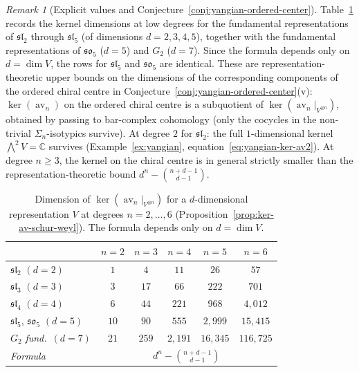 \documentclass[11pt,reqno]{amsart}
\theoremstyle{definition}
\theoremstyle{remark}
\newtheorem{remark}[theorem]{Remark}
\DeclareMathOperator{\av}{av}
\newcommand{\CC}{\mathbb{C}}
\numberwithin{equation}{section}
\begin{document}
\begin{remark}[Explicit values and
Conjecture~\textup{\ref{conj:yangian-ordered-center}}]
\label{rem:ker-av-table}
Table~\ref{tab:ker-av-dims} records the kernel dimensions
at low degrees for the fundamental representations of
$\mathfrak{sl}_2$ through $\mathfrak{sl}_5$ (of dimensions
$d = 2, 3, 4, 5$), together with the fundamental
representations of $\mathfrak{so}_5$ ($d = 5$) and
$G_2$ ($d = 7$). Since the formula depends only on
$d = \dim V$, the rows for $\mathfrak{sl}_5$ and
$\mathfrak{so}_5$ are identical.
These are representation-theoretic upper bounds on the
dimensions of the corresponding components of the ordered
chiral centre in
Conjecture~\ref{conj:yangian-ordered-center}(v):
$\ker(\av_n)$ on the ordered chiral centre is a subquotient
of $\ker(\av_n\big|_{V^{\otimes n}})$, obtained by passing
to bar-complex cohomology
(only the cocycles in the non-trivial $\Sigma_n$-isotypics
survive). At degree $2$ for $\mathfrak{sl}_2$: the full
$1$-dimensional kernel $\bigwedge^2 V = \CC$ survives
(Example~\ref{ex:yangian},
equation~\eqref{eq:yangian-ker-av2}).
At degree $n \geq 3$, the kernel on the chiral centre is
in general strictly smaller than the
representation-theoretic bound $d^n - \binom{n+d-1}{d-1}$.

\begin{table}[h]
\centering
\renewcommand{\arraystretch}{1.3}
\begin{tabular}{@{} l c c c c c @{}}
\toprule
  & $n = 2$ & $n = 3$ & $n = 4$ & $n = 5$ & $n = 6$ \\
\midrule
$\mathfrak{sl}_2$ $(d{=}2)$
  & $1$ & $4$ & $11$ & $26$ & $57$ \\
$\mathfrak{sl}_3$ $(d{=}3)$
  & $3$ & $17$ & $66$ & $222$ & $701$ \\
$\mathfrak{sl}_4$ $(d{=}4)$
  & $6$ & $44$ & $221$ & $968$ & $4{,}012$ \\
$\mathfrak{sl}_5$, $\mathfrak{so}_5$ $(d{=}5)$
  & $10$ & $90$ & $555$ & $2{,}999$ & $15{,}415$ \\
$G_2$ \textit{fund.}\ $(d{=}7)$
  & $21$ & $259$ & $2{,}191$ & $16{,}345$ & $116{,}725$ \\
\midrule
\textit{Formula}
  & \multicolumn{5}{c}{$d^n - \binom{n+d-1}{d-1}$} \\
\bottomrule
\end{tabular}
\caption{Dimension of $\ker(\av_n\big|_{V^{\otimes n}})$
for a $d$-dimensional representation $V$ at degrees
$n = 2, \ldots, 6$
\textup{(Proposition~\ref{prop:ker-av-schur-weyl})}.
The formula depends only on $d = \dim V$.}
\label{tab:ker-av-dims}
\end{table}
\end{remark}
\end{document}
